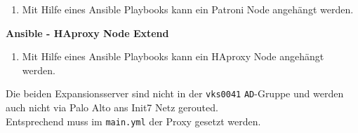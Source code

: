 \begin{flushleft}
\begin{description}
\begin{enumerate}[resume]
            \item Mit Hilfe eines \Gls{Ansible} Playbooks kann ein Patroni Node angehängt werden.
        \end{enumerate}
        \item \textbf{Ansible - HAproxy Node Extend}\hfill \\
        \begin{enumerate}[resume]
            \item Mit Hilfe eines \Gls{Ansible} Playbooks kann ein HAproxy Node angehängt werden.
        \end{enumerate}
    \end{description}
    \begin{warning}
        Die beiden Expansionsserver sind nicht in der \texttt{vks0041} \texttt{AD}-Gruppe und werden auch nicht via Palo Alto ans Init7 Netz gerouted.\\
        Entsprechend muss im \texttt{main.yml} der Proxy gesetzt werden.
    \end{warning}
\end{flushleft}